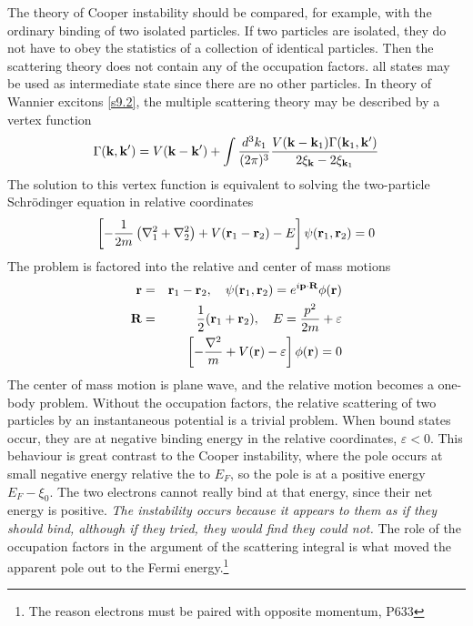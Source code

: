 The theory of Cooper instability should be compared, for example, with the ordinary binding of two isolated particles.
If two particles are isolated, they do not have to obey the statistics of a collection of identical particles.
Then the scattering theory does not contain any of the occupation factors. all states may be used as intermediate state since there are no other particles.
In theory of Wannier excitons \ref{s9.2}, the multiple scattering theory may be described by a vertex function
\begin{equation}
    \Gamma(\mathbf{k},\mathbf{k}') = V(\mathbf{k}-\mathbf{k}') + \int \frac{d^3 k_1}{(2\pi)^3} \frac{V(\mathbf{k}-\mathbf{k}_1) \Gamma(\mathbf{k}_1,\mathbf{k}')}{2\xi_{\mathbf{k}} - 2\xi_{\mathbf{k}_1}}  \label{10.16}
\end{equation}
The solution to this vertex function is equivalent to solving the two-particle Schr{\"o}dinger equation in relative coordinates
\begin{equation}
    \left[- \frac{1}{2m} \left(\nabla_1^2 + \nabla_2^2 \right) + V(\mathbf{r}_1 -\mathbf{r}_2) -E \right] \psi(\mathbf{r}_1,\mathbf{r}_2) = 0   \label{10.17}
\end{equation}
The problem is factored into the relative and center of mass motions
\begin{eqnarray}
    \mathbf{r} &=& \mathbf{r}_1 - \mathbf{r}_2, ~ ~ ~ \psi(\mathbf{r}_1,\mathbf{r}_2) = e^{i \mathbf{p} \cdot \mathbf{R}} \phi(\mathbf{r}) \label{10.18}\\
    \mathbf{R} &=& \frac{1}{2} (\mathbf{r}_1 + \mathbf{r}_2), ~ ~ ~ E= \frac{p^2}{2m} + \varepsilon   \label{10.19} \\
    &&\left[ - \frac{\nabla^2}{m} + V(\mathbf{r}) - \varepsilon \right] \phi(\mathbf{r}) = 0 \label{10.20}
\end{eqnarray}
The center of mass motion is plane wave, and the relative motion becomes a one-body problem.
Without the occupation factors, the relative scattering of two particles by an instantaneous potential is a trivial problem.
When bound states occur, they are at negative binding energy in the relative coordinates, $\varepsilon<0$.
This behaviour is great contrast to the Cooper instability, where the pole occurs at small negative energy relative the to $E_F$, so the pole is at a positive energy $E_F-\xi_0$.
The two electrons cannot really bind at that energy, since their net energy is positive.
\textit{The instability occurs because it appears to them as if they should bind, although if they tried, they would find they could not.}
The role of the occupation factors in the argument of the scattering integral is what moved the apparent pole out to the Fermi energy.\footnote{The reason electrons must be paired with opposite momentum, P633}

